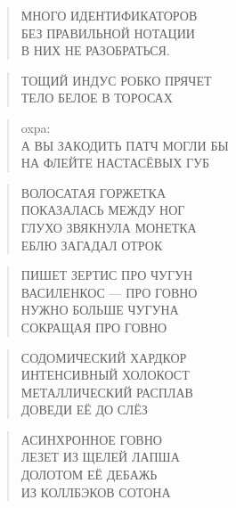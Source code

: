 \poemtitle{***}
\begin{verse}
МНОГО ИДЕНТИФИКАТОРОВ\\
БЕЗ ПРАВИЛЬНОЙ НОТАЦИИ\\
В НИХ НЕ РАЗОБРАТЬСЯ.
\end{verse}

\poemtitle{***}
\begin{verse}
ТОЩИЙ ИНДУС РОБКО ПРЯЧЕТ\\
ТЕЛО БЕЛОЕ В ТОРОСАХ
\end{verse}

\poemtitle{***}
\begin{verse}
oxpa: \\
А ВЫ ЗАКОДИТЬ ПАТЧ МОГЛИ БЫ\\
НА ФЛЕЙТЕ НАСТАСЁВЫХ ГУБ
\end{verse}

\poemtitle{***}
\begin{verse}
ВОЛОСАТАЯ ГОРЖЕТКА \\
ПОКАЗАЛАСЬ МЕЖДУ НОГ\\
ГЛУХО ЗВЯКНУЛА МОНЕТКА\\
ЕБЛЮ ЗАГАДАЛ ОТРОК
\end{verse}

\poemtitle{***}
\begin{verse}
ПИШЕТ ЗЕРТИС ПРО ЧУГУН\\
ВАСИЛЕНКОС — ПРО ГОВНО\\
НУЖНО БОЛЬШЕ ЧУГУНА\\
СОКРАЩАЯ ПРО ГОВНО
\end{verse}

\poemtitle{***}
\begin{verse}
СОДОМИЧЕСКИЙ ХАРДКОР\\
ИНТЕНСИВНЫЙ ХОЛОКОСТ\\
МЕТАЛЛИЧЕСКИЙ РАСПЛАВ\\
ДОВЕДИ ЕЁ ДО СЛЁЗ
\end{verse}

\poemtitle{***}
\begin{verse}
АСИНХРОННОЕ ГОВНО\\
ЛЕЗЕТ ИЗ ЩЕЛЕЙ ЛАПША\\
ДОЛОТОМ ЕЁ ДЕБАЖЬ\\
ИЗ КОЛЛБЭКОВ СОТОНА
\end{verse}

